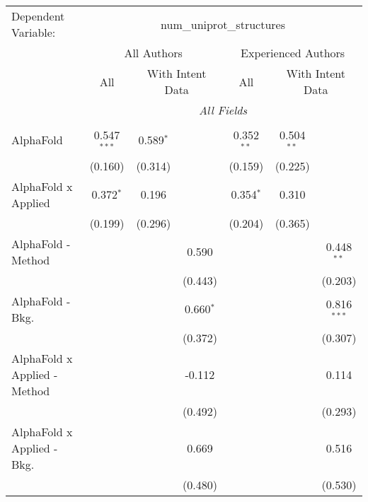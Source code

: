 \begingroup
\centering
\begin{tabular}{lcccccc}
   \tabularnewline \midrule \midrule
   Dependent Variable: & \multicolumn{6}{c}{num\_uniprot\_structures}\\
 & \multicolumn{3}{c}{All Authors} & \multicolumn{3}{c}{Experienced Authors} \\
\cmidrule(lr){2-4} \cmidrule(lr){5-7}
 & \multicolumn{1}{c}{All} & \multicolumn{2}{c}{With Intent Data} & \multicolumn{1}{c}{All} & \multicolumn{2}{c}{With Intent Data} \\
\cmidrule(lr){2-2} \cmidrule(lr){3-4} \cmidrule(lr){5-5} \cmidrule(lr){6-7}
 & \multicolumn{6}{c}{\textit{All Fields}} \\ \\
   AlphaFold                      & 0.547$^{***}$ & 0.589$^{*}$ &              & 0.352$^{**}$  & 0.504$^{**}$ &   \\   
                                  & (0.160)       & (0.314)     &              & (0.159)       & (0.225)      &   \\   
   AlphaFold x Applied            & 0.372$^{*}$   & 0.196       &              & 0.354$^{*}$   & 0.310        &   \\   
                                  & (0.199)       & (0.296)     &              & (0.204)       & (0.365)      &   \\   
   AlphaFold - Method             &               &             & 0.590        &               &              & 0.448$^{**}$\\   
                                  &               &             & (0.443)      &               &              & (0.203)\\   
   AlphaFold - Bkg.               &               &             & 0.660$^{*}$  &               &              & 0.816$^{***}$\\   
                                  &               &             & (0.372)      &               &              & (0.307)\\   
   AlphaFold x Applied - Method   &               &             & -0.112       &               &              & 0.114\\   
                                  &               &             & (0.492)      &               &              & (0.293)\\   
   AlphaFold x Applied - Bkg.     &               &             & 0.669        &               &              & 0.516\\   
                                  &               &             & (0.480)      &               &              & (0.530)\\   

\end{tabular}
